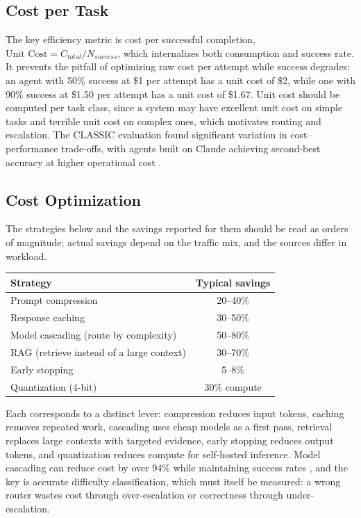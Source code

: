 \documentclass[11pt]{book}
\begin{document}
\subsection{Cost per Task}

The key efficiency metric is cost per successful completion, $\text{Unit Cost} = C_{total} / N_{success}$, which internalizes both consumption and success rate. It prevents the pitfall of optimizing raw cost per attempt while success degrades: an agent with 50\% success at \$1 per attempt has a unit cost of \$2, while one with 90\% success at \$1.50 per attempt has a unit cost of \$1.67. Unit cost should be computed per task class, since a system may have excellent unit cost on simple tasks and terrible unit cost on complex ones, which motivates routing and escalation. The CLASSIC evaluation found significant variation in cost--performance trade-offs, with agents built on Claude achieving second-best accuracy at higher operational cost \cite{classic2025}.

\subsection{Cost Optimization}

The strategies below and the savings reported for them should be read as orders of magnitude; actual savings depend on the traffic mix, and the sources differ in workload.

\begin{center}
\begin{tabular}{lc}
\toprule
Strategy & Typical savings \\
\midrule
Prompt compression & 20--40\% \\
Response caching & 30--50\% \\
Model cascading (route by complexity) & 50--80\% \\
RAG (retrieve instead of a large context) & 30--70\% \\
Early stopping & 5--8\% \\
Quantization (4-bit) & 30\% compute \\
\bottomrule
\end{tabular}
\end{center}

Each corresponds to a distinct lever: compression reduces input tokens, caching removes repeated work, cascading uses cheap models as a first pass, retrieval replaces large contexts with targeted evidence, early stopping reduces output tokens, and quantization reduces compute for self-hosted inference. Model cascading can reduce cost by over 94\% while maintaining success rates \cite{budgetmlagent2024}, and the key is accurate difficulty classification, which must itself be measured: a wrong router wastes cost through over-escalation or correctness through under-escalation.
\end{document}
